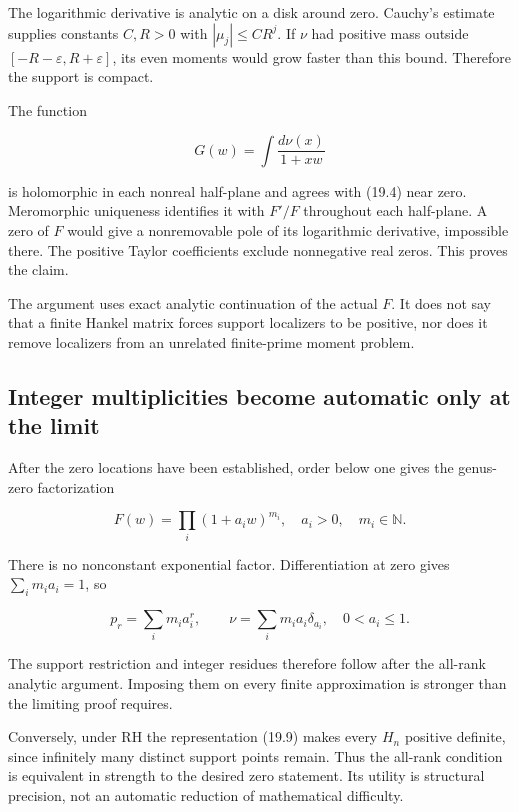 \documentclass[
  10pt,
  a4paper,
  10pt,
  oneside,
  openany]{book}
\begin{document}
The logarithmic derivative is analytic on a disk around zero. Cauchy's
estimate supplies constants \(C,R>0\) with \(|\mu_j|\le CR^j\). If
\(\nu\) had positive mass outside \([-R-\varepsilon,R+\varepsilon]\),
its even moments would grow faster than this bound. Therefore the
support is compact.

The function

\[
G(w)=\int\frac{d\nu(x)}{1+xw}
\tag{19.7}\label{eq:19.7}
\]

is holomorphic in each nonreal half-plane and agrees with (19.4) near
zero. Meromorphic uniqueness identifies it with \(F'/F\) throughout each
half-plane. A zero of \(F\) would give a nonremovable pole of its
logarithmic derivative, impossible there. The positive Taylor
coefficients exclude nonnegative real zeros. This proves the claim.

The argument uses exact analytic continuation of the actual \(F\). It
does not say that a finite Hankel matrix forces support localizers to be
positive, nor does it remove localizers from an unrelated finite-prime
moment problem.

\subsection{Integer multiplicities become automatic only at the
limit}\label{integer-multiplicities-become-automatic-only-at-the-limit}

After the zero locations have been established, order below one gives
the genus-zero factorization

\[
F(w)=\prod_i(1+a_iw)^{m_i},
\quad a_i>0,\quad m_i\in\mathbb N.
\tag{19.8}\label{eq:19.8}
\]

There is no nonconstant exponential factor. Differentiation at zero
gives \(\sum_i m_i a_i=1\), so

\[
p_r=\sum_i m_i a_i^r,
\qquad
\nu=\sum_i m_i a_i\delta_{a_i},
\quad0<a_i\le1.
\tag{19.9}\label{eq:19.9}
\]

The support restriction and integer residues therefore follow after the
all-rank analytic argument. Imposing them on every finite approximation
is stronger than the limiting proof requires.

Conversely, under RH the representation (19.9) makes every \(H_n\)
positive definite, since infinitely many distinct support points remain.
Thus the all-rank condition is equivalent in strength to the desired
zero statement. Its utility is structural precision, not an automatic
reduction of mathematical difficulty.
\end{document}
